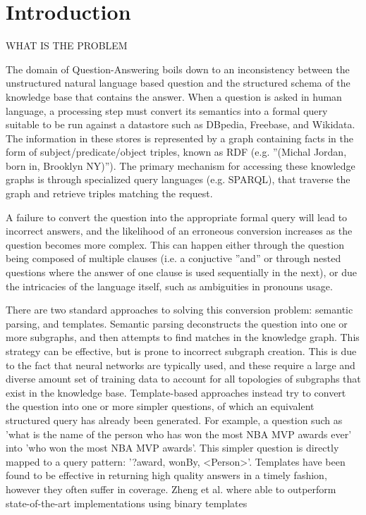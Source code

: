 \documentclass[sigplan,screen]{acmart}
\begin{document}
\section{Introduction}
WHAT IS THE PROBLEM

The domain of Question-Answering boils down to an inconsistency between the unstructured natural language based question and the structured schema of the knowledge base that contains the answer.  When a question is asked in human language, a processing step must convert its semantics into a formal query suitable to be run against a datastore such as DBpedia, Freebase, and Wikidata. The information in these stores is represented by a graph containing facts in the form of subject/predicate/object triples, known as RDF (e.g. ''(Michal Jordan, born in, Brooklyn NY)''). The primary mechanism for accessing these knowledge graphs is through specialized query languages (e.g. SPARQL), that traverse the graph and retrieve triples matching the request.

A failure to convert the question into the appropriate formal query will lead to incorrect answers, and the likelihood of an erroneous conversion increases as the question becomes more complex. This can happen either through the question being composed of multiple clauses (i.e. a conjuctive ''and'' or through nested questions where the answer of one clause is used sequentially in the next), or due the intricacies of the language itself, such as ambiguities in pronouns usage.

There are two standard approaches to solving this conversion problem: semantic parsing, and templates. Semantic parsing deconstructs the question into one or more subgraphs, and then attempts to find matches in the knowledge graph. This strategy can be effective, but is prone to incorrect subgraph creation. This is due to the fact that neural networks are typically used, and these require a large and diverse amount set of training data to account for all topologies of subgraphs that exist in the knowledge base. Template-based approaches instead try to convert the question into one or more simpler questions, of which an equivalent structured query has already been generated. For example, a question such as 'what is the name of the person who has won the most NBA MVP awards ever' into 'who won the most NBA MVP awards'. This simpler question is directly mapped to a query pattern: '?award, wonBy, <Person>'. Templates have been found to be effective in returning high quality answers in a timely fashion, however they often suffer in coverage. Zheng et al. where able to outperform state-of-the-art implementations using binary templates
\end{document}
